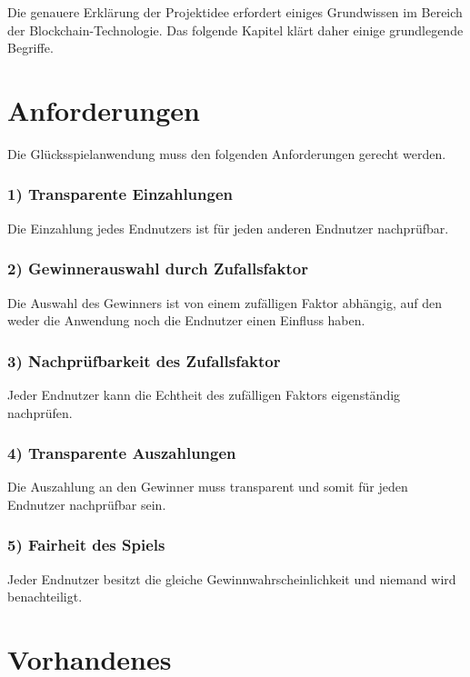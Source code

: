Die genauere Erklärung der Projektidee erfordert einiges Grundwissen im Bereich der Blockchain-Technologie. Das folgende Kapitel klärt daher einige grundlegende Begriffe.



\section{Anforderungen}
Die Glücksspielanwendung muss den folgenden Anforderungen gerecht werden.
\subsubsection{1) Transparente Einzahlungen}
Die Einzahlung jedes Endnutzers ist für jeden anderen Endnutzer nachprüfbar.
\subsubsection{2) Gewinnerauswahl durch Zufallsfaktor}
Die Auswahl des Gewinners ist von einem zufälligen Faktor abhängig, auf den weder die Anwendung noch die Endnutzer einen Einfluss haben.
\subsubsection{3) Nachprüfbarkeit des Zufallsfaktor}
Jeder Endnutzer kann die Echtheit des zufälligen Faktors eigenständig nachprüfen.
\subsubsection{4) Transparente Auszahlungen}
Die Auszahlung an den Gewinner muss transparent und somit für jeden Endnutzer nachprüfbar sein.
\subsubsection{5) Fairheit des Spiels}
Jeder Endnutzer besitzt die gleiche Gewinnwahrscheinlichkeit und niemand wird benachteiligt.

\section{Vorhandenes}

